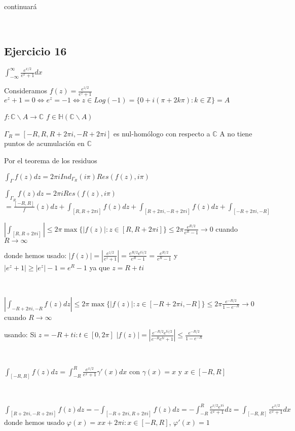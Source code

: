 continuará

\

\subsection{Ejercicio 16}

$\int_{-\infty}^{\infty} \frac{e^{x/2}}{e^x+1}dx$

Consideramos 
$f(z) = \frac{e^{z/2}}{e^z+1}$
$e^z+1=0 \Longleftrightarrow e^z = -1 \Longleftrightarrow z\in Log(-1) = \{ 0+i(\pi+2k\pi) : k\in\mathbb{Z} \} = A$

$f : \mathbb{C}\backslash A \rightarrow \mathbb{C}$
$f\in\mathbb{H}(\mathbb{C}\backslash A)$

$\Gamma_R  = [-R,R,R+2\pi i, -R+2\pi i]$ es nul-homólogo con respecto a $\mathbb{C}$
A no tiene puntos de acumulación en $\mathbb{C}$

Por el teorema de los residuos

$\int_{\Gamma} f(z)dz = 2\pi i Ind_{\Gamma_R}(i\pi) Res(f(z),i\pi)$

$\int_{\Gamma_R} f(z)dz = 2\pi i Res(f(z),i\pi)$
$= \frac{[-R,R]} f(z)dz + \int_{[R,R+2\pi i]} f(z)dz + \int_{[R+2\pi i, -R+2\pi i]} f(z)dz + \int_{[-R+2\pi i, -R]}$


$\left| \int_{[R,R+2\pi i]} \right| \leq 2\pi\max\{ |f(z)| : z\in [R,R+2\pi i] \} \leq 2\pi \frac{e^{R/2}}{e^R-1} \rightarrow 0$ cuando $R\rightarrow \infty$

donde hemos usado:
$|f(z)| = |\frac{e^{z/2}}{e^z+1}| = \frac{e^{R/2} e^{ti/2}}{e^R-1} = \frac{e^{R/2}}{e^R-1}$
y
$|e^z+1| \geq |e^z|-1 = e^R-1$ ya que $z=R+ti$


\

$\left| \int_{-R+2\pi i, -R} f(z)dz \right| \leq 2\pi \max \{ |f(z)| : z\in[-R+2\pi i, -R] \} \leq 2\pi \frac{e^{-R/2}}{1-e^{-R}} \rightarrow 0$ cuando $R\rightarrow\infty$

usando:
Si $z= -R+ti : t\in[0,2\pi]$
$|f(z)| = \left| \frac{e^{-R/2}e^{ti/2}}{e^{-R}e^{ti}+1} \right| \leq \frac{e^{-R/2}}{1-e^{-R}}$

\

$\int_{[-R,R]} f(z)dz = \int_{-R}^{R} \frac{e^{x/2}}{e^x+1} \gamma'(x)dx$ con $\gamma(x)=x$ y $x\in[-R,R]$

\

$\int_{[R+2\pi i, -R+2\pi i]} f(z)dz = -\int_{[-R+2\pi i, R+2\pi i]} f(z)dz = -\int_{-R}^{R} \frac{e^{x/2}e^{\pi i}}{e^x+1}dz = \int_{[-R,R]} \frac{e^{x/2}}{e^x+1}dx$
donde hemos usado
$\varphi (x) = xx+2\pi i : x\in[-R,R]$, $\varphi'(x) = 1$

